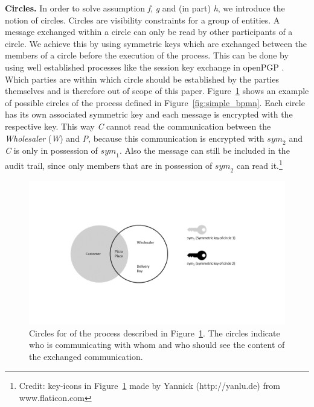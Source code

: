 \documentclass[runningheads]{llncs}
\newcommand{\ber}[1]{\textit{#1}}
\newcommand{\reffig}[1]{Figure~\ref{#1}}
\begin{document}
\textbf{Circles.} In order to solve assumption \ber{f}, \ber{g} and (in part) \ber{h}, we introduce the notion of circles. Circles are visibility constraints for a group of entities. A message exchanged within a circle can only be read by other participants of a circle. We achieve this by using symmetric keys which are exchanged between the members of a circle before the execution of the process. This can be done by using well established processes like the session key exchange in openPGP \cite{openpgp}. Which parties are within which circle should be established by the parties themselves and is therefore out of scope of this paper. \reffig{fig:circles} shows an example of possible circles of the process defined in  \reffig{fig:simple_bpmn}. Each circle has its own associated symmetric key and each message is encrypted with the respective key. This way \ber{C} cannot read the communication between the \ber{Wholesaler} (\ber{W}) and \ber{P}, because this communication is encrypted with ${sym}_2$ and \ber{C} is only in possession of ${sym}_1$. Also the message can still be included in the audit trail, since only members that are in possession of ${sym}_2$ can read it.\footnote{Credit: key-icons in \reffig{fig:circles} made by Yannick (http://yanlu.de) from www.flaticon.com}


\begin{center}
\begin{figure}
    \centering
    \includegraphics[trim=5cm 5cm 6cm 5.6cm,clip=true,scale=0.5]{circles.png}
    \caption{Circles for of the process described in \reffig{fig:circles}. The circles indicate who is communicating with whom and who should see the content of the exchanged communication.} 
    \label{fig:circles}
\end{figure}
\end{center}
\end{document}
